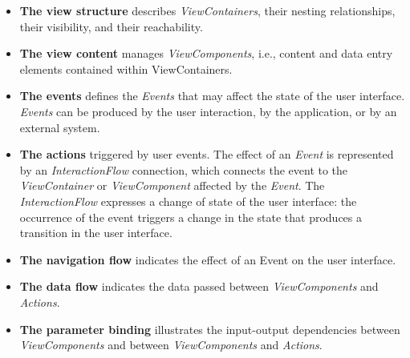 \begin{itemize}
  \item \textbf{The view structure} describes \textit{ViewContainers}, their nesting relationships, their visibility, and their reachability.
    
  \item \textbf{The view content} manages \textit{ViewComponents}, i.e., content and data entry elements contained within ViewContainers.
  
  \item \textbf{The events} defines the \textit{Events} that may affect the state of the user interface. \textit{Events} can be produced by the user interaction, by the application, or by an external system.

  \item \textbf{The actions} triggered by user events. The effect of an \textit{Event} is represented by an \textit{InteractionFlow} connection, which connects the event to the \textit{ViewContainer} or \textit{ViewComponent} affected by the \textit{Event}. The \textit{InteractionFlow} expresses a change of state of the user interface: the occurrence of the event triggers a change in the state that produces a transition in the user interface.
  
  \item \textbf{The navigation flow} indicates the effect of an Event on the user interface.

  \item \textbf{The data flow} indicates the data passed between \textit{ViewComponents} and \textit{Actions}.
  
  \item \textbf{The parameter binding} illustrates the input-output dependencies between \textit{ViewComponents} and between \textit{ViewComponents} and \textit{Actions}. 


\end{itemize} 

